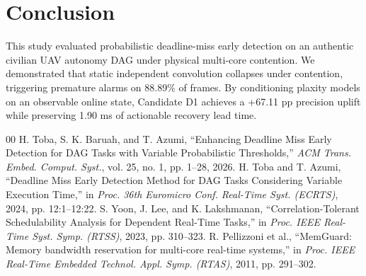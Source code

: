 \documentclass[conference]{IEEEtran}
\begin{document}
\section{Conclusion}
This study evaluated probabilistic deadline-miss early detection on an authentic civilian UAV autonomy DAG under physical multi-core contention. We demonstrated that static independent convolution collapses under contention, triggering premature alarms on 88.89\% of frames. By conditioning plaxity models on an observable online state, Candidate D1 achieves a +67.11 pp precision uplift while preserving 1.90 ms of actionable recovery lead time.

\begin{thebibliography}{00}
 H. Toba, S. K. Baruah, and T. Azumi, ``Enhancing Deadline Miss Early Detection for DAG Tasks with Variable Probabilistic Thresholds,'' \textit{ACM Trans. Embed. Comput. Syst.}, vol. 25, no. 1, pp. 1--28, 2026.
 H. Toba and T. Azumi, ``Deadline Miss Early Detection Method for DAG Tasks Considering Variable Execution Time,'' in \textit{Proc. 36th Euromicro Conf. Real-Time Syst. (ECRTS)}, 2024, pp. 12:1--12:22.
 S. Yoon, J. Lee, and K. Lakshmanan, ``Correlation-Tolerant Schedulability Analysis for Dependent Real-Time Tasks,'' in \textit{Proc. IEEE Real-Time Syst. Symp. (RTSS)}, 2023, pp. 310--323.
 R. Pellizzoni et al., ``MemGuard: Memory bandwidth reservation for multi-core real-time systems,'' in \textit{Proc. IEEE Real-Time Embedded Technol. Appl. Symp. (RTAS)}, 2011, pp. 291--302.
\end{thebibliography}
\end{document}
